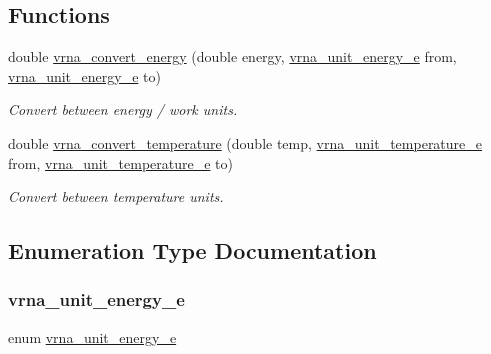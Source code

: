 \subsection*{Functions}
\begin{DoxyCompactItemize}
\item 
double \mbox{\hyperlink{group__units_gada3216e97b410928ba19a4487e5fe6f2}{vrna\+\_\+convert\+\_\+energy}} (double energy, \mbox{\hyperlink{group__units_ga1d2fd1e73caf995e4dc69072b33e6ba5}{vrna\+\_\+unit\+\_\+energy\+\_\+e}} from, \mbox{\hyperlink{group__units_ga1d2fd1e73caf995e4dc69072b33e6ba5}{vrna\+\_\+unit\+\_\+energy\+\_\+e}} to)
\begin{DoxyCompactList}\small\item\em Convert between energy / work units. \end{DoxyCompactList}\item 
double \mbox{\hyperlink{group__units_gaf1bb1db32eba33b9f306214f5955d0c2}{vrna\+\_\+convert\+\_\+temperature}} (double temp, \mbox{\hyperlink{group__units_gadeca8d9e91ef85f1b652cc8aef63d7e4}{vrna\+\_\+unit\+\_\+temperature\+\_\+e}} from, \mbox{\hyperlink{group__units_gadeca8d9e91ef85f1b652cc8aef63d7e4}{vrna\+\_\+unit\+\_\+temperature\+\_\+e}} to)
\begin{DoxyCompactList}\small\item\em Convert between temperature units. \end{DoxyCompactList}\end{DoxyCompactItemize}


\subsection{Enumeration Type Documentation}
\mbox{\label{group__units_ga1d2fd1e73caf995e4dc69072b33e6ba5}} 
\subsubsection{\texorpdfstring{vrna\+\_\+unit\+\_\+energy\+\_\+e}{vrna\_unit\_energy\_e}}
{\footnotesize\ttfamily enum \mbox{\hyperlink{group__units_ga1d2fd1e73caf995e4dc69072b33e6ba5}{vrna\+\_\+unit\+\_\+energy\+\_\+e}}}



